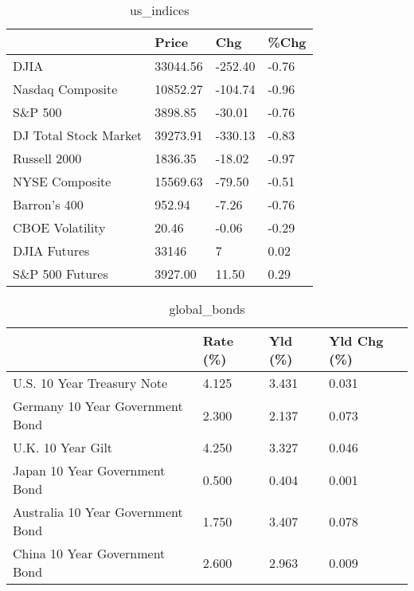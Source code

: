 \documentclass{article}%
\begin{document}
%


\begin{table}[htbp]%
\caption{us\_indices}%
\centering%
\begin{adjustbox}{width=1\textwidth}%
\begin{tabular}{llll}
\toprule
                      &    Price &     Chg &  \%Chg \\
\midrule
                 DJIA & 33044.56 & -252.40 & -0.76 \\
     Nasdaq Composite & 10852.27 & -104.74 & -0.96 \\
              S\&P 500 &  3898.85 &  -30.01 & -0.76 \\
DJ Total Stock Market & 39273.91 & -330.13 & -0.83 \\
         Russell 2000 &  1836.35 &  -18.02 & -0.97 \\
       NYSE Composite & 15569.63 &  -79.50 & -0.51 \\
         Barron's 400 &   952.94 &   -7.26 & -0.76 \\
      CBOE Volatility &    20.46 &   -0.06 & -0.29 \\
         DJIA Futures &    33146 &       7 &  0.02 \\
      S\&P 500 Futures &  3927.00 &   11.50 &  0.29 \\
\bottomrule
\end{tabular}
%
\end{adjustbox}%
\end{table}

%


\begin{table}[htbp]%
\caption{global\_bonds}%
\centering%
\begin{adjustbox}{width=1\textwidth}%
\begin{tabular}{llll}
\toprule
                                  & Rate (\%) & Yld (\%) & Yld Chg (\%) \\
\midrule
       U.S. 10 Year Treasury Note &    4.125 &   3.431 &       0.031 \\
  Germany 10 Year Government Bond &    2.300 &   2.137 &       0.073 \\
                U.K. 10 Year Gilt &    4.250 &   3.327 &       0.046 \\
    Japan 10 Year Government Bond &    0.500 &   0.404 &       0.001 \\
Australia 10 Year Government Bond &    1.750 &   3.407 &       0.078 \\
    China 10 Year Government Bond &    2.600 &   2.963 &       0.009 \\
\bottomrule
\end{tabular}
%
\end{adjustbox}%
\end{table}
\end{document}
